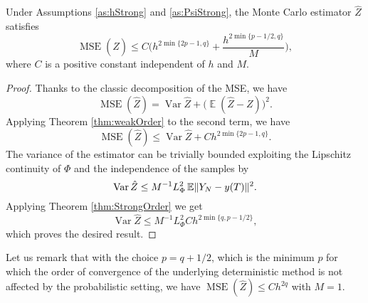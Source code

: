 \documentclass{siamart1116}
\numberwithin{theorem}{section}
\DeclarePairedDelimiter{\norm}{\|}{\|}
\newcommand{\Var}{\operatorname{Var}}
\newcommand{\E}{\operatorname{\mathbb{E}}}
\newcommand{\MSE}{\operatorname{MSE}}
\begin{document}
\begin{theorem}\label{thm:MSEMonteCarlo} Under Assumptions \ref{as:hStrong} and \ref{as:PsiStrong}, the Monte Carlo estimator $\hat Z$ satisfies
	\begin{equation}\label{eq:MSEBound}
		\MSE(\hat Z) \leq C\Big(h^{2\min\{2p - 1, q\}} + \frac{h^{2\min\{p-1/2, q\}}}{M}\Big),
	\end{equation}
	where $C$ is a positive constant independent of $h$ and $M$.
\end{theorem}
\begin{proof} Thanks to the classic decomposition of the MSE, we have
	\begin{equation}\label{eq:MSEDecomposition}
		\MSE(\hat Z) = \Var \hat Z  + \big(\E(\hat Z - Z)\big)^2.
	\end{equation}
	Applying Theorem \ref{thm:weakOrder} to the second term, we have
	\begin{equation}\label{eq:MSEWeakOrder}
		\MSE(\hat Z) \leq \Var \hat Z  + Ch^{2\min\{2p-1, q\}}.
	\end{equation}
	The variance of the estimator can be trivially bounded exploiting the Lipschitz continuity of $\Phi$ and the independence of the samples by
	\begin{equation}\label{eq:MSELipschitz}
		\Var\hat Z \leq M^{-1} L_\Phi^2 \E \norm{Y_N - y(T)}^2.
	\end{equation}
	Applying Theorem \ref{thm:StrongOrder} we get
	\begin{equation}
		\Var\hat Z \leq M^{-1} L_\Phi^2 Ch^{2\min\{q, p-1/2\}},
	\end{equation}
	which proves the desired result.
\end{proof}
Let us remark that with the choice $p = q + 1/2$, which is the minimum $p$ for which the order of convergence of the underlying deterministic method is not affected by the probabilistic setting, we have $\MSE(\hat Z) \leq Ch^{2q}$ with $M = 1$.
\end{document}
